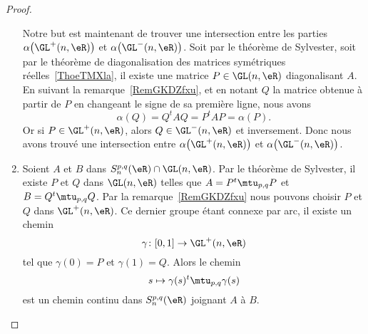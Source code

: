 \begin{proof}
\begin{enumerate}
		      Notre but est maintenant de trouver une intersection entre les parties \( \alpha\big( \GL^+(n,\eR) \big)\) et \( \alpha\big( \GL^-(n,\eR) \big)\). Soit par le théorème de Sylvester, soit par le théorème de diagonalisation des matrices symétriques réelles~\ref{ThoeTMXla}, il existe une matrice \( P\in \GL(n,\eR)\) diagonalisant \( A\). En suivant la remarque~\ref{RemGKDZfxu}, et en notant \( Q\) la matrice obtenue à partir de \( P\) en changeant le signe de sa première ligne, nous avons
		      \begin{equation}
			      \alpha(Q)=Q^tAQ=P^tAP=\alpha(P).
		      \end{equation}
		      Or si \( P\in \GL^+(n,\eR)\), alors \( Q\in \GL^-(n,\eR)\) et inversement. Donc nous avons trouvé une intersection entre \( \alpha\big( \GL^+(n,\eR) \big)\) et \( \alpha\big( \GL^-(n,\eR) \big)\).

		\item

		      Soient \( A\) et \( B\) dans \( S_n^{p,q}(\eR)\cap\GL(n,\eR)\). Par le théorème de Sylvester, il existe \( P\) et \( Q\) dans \( \GL(n,\eR)\) telles que \( A=P^t\mtu_{p,q}P\) et \( B=Q^t\mtu_{p,q}Q\). Par la remarque~\ref{RemGKDZfxu} nous pouvons choisir \( P\) et \( Q\) dans \( \GL^+(n,\eR)\). Ce dernier groupe étant connexe par arc, il existe un chemin
		      \begin{equation}
			      \gamma\colon \mathopen[ 0 , 1 \mathclose]\to \GL^+(n,\eR)
		      \end{equation}
		      tel que \( \gamma(0)=P\) et \( \gamma(1)=Q\). Alors le chemin
		      \begin{equation}
			      s\mapsto \gamma(s)^t\mtu_{p,q}\gamma(s)
		      \end{equation}
		      est un chemin continu dans \( S_n^{p,q}(\eR)\) joignant \( A\) à \( B\).
	\end{enumerate}
\end{proof}


